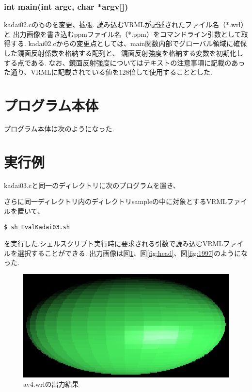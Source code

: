 \documentclass[a4j,dvipdfmx]{jsarticle}
\begin{document}
\subsubsection{int main(int argc, char *argv[])}
kadai02.cのものを変更、拡張.
読み込むVRMLが記述されたファイル名（*.wrl）と
出力画像を書き込むppmファイル名（*.ppm）をコマンドライン引数として取得する.
kadai02.cからの変更点としては、main関数内部でグローバル領域に確保した鏡面反射係数を格納する配列と、
鏡面反射強度を格納する変数を初期化しする点である.
なお、鏡面反射強度についてはテキストの注意事項に記載のあった通り、VRMLに記載されている値を128倍して使用することとした.
\section{プログラム本体}
プログラム本体は次のようになった.



\section{実行例}
kadai03.cと同一のディレクトリに次のプログラムを置き、

さらに同一ディレクトリ内のディレクトリsampleの中に対象とするVRMLファイルを置いて、
\begin{lstlisting}
$ sh EvalKadai03.sh
\end{lstlisting}
を実行した.シェルスクリプト実行時に要求される引数で読み込むVRMLファイルを選択することができる.
出力画像は図\ref{fig:av4}、図\ref{fig:head}、図\ref{fig:1997}のようになった.

\begin{figure}[hp]
  \begin{center}
    \includegraphics[clip,scale=0.5]{images/Kadai03ForAv4.eps}
    \caption{av4.wrlの出力結果}
    \label{fig:av4}
  \end{center}
\end{figure}
\end{document}
